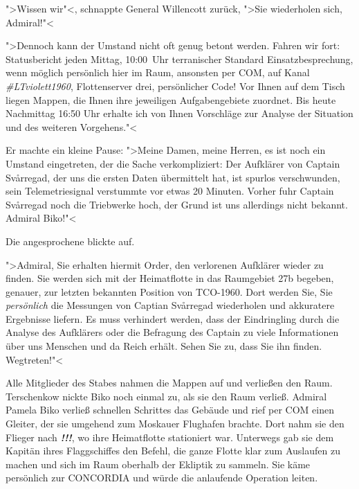 ">Wissen wir"<, schnappte General Willencott zurück, ">Sie wiederholen sich, Admiral!"<

\begin{sloppypar}
">Dennoch kann der Umstand nicht oft genug betont werden. Fahren wir fort: Statusbericht jeden Mittag, 10:00~Uhr terranischer Standard Einsatzbesprechung, wenn möglich persönlich hier im Raum, ansonsten per COM, auf Kanal \mbox{\emph{\#LTviolett1960}}, Flottenserver drei, persönlicher Code! Vor Ihnen auf dem Tisch liegen Mappen, die Ihnen ihre jeweiligen Aufgabengebiete zuordnet. Bis heute Nachmittag 16:50 Uhr erhalte ich von Ihnen Vorschläge zur Analyse der Situation und des weiteren Vorgehens."<
\end{sloppypar}

Er machte ein kleine Pause: ">Meine Damen, meine Herren, es ist noch ein Umstand eingetreten, der die Sache verkompliziert: Der Aufklärer von Captain Svårregad, der uns die ersten Daten übermittelt hat, ist spurlos verschwunden, sein Telemetriesignal verstummte vor etwas 20 Minuten. Vorher fuhr Captain Svårregad noch die Triebwerke hoch, der Grund ist uns allerdings nicht bekannt. Admiral Biko!"<

Die angesprochene blickte auf.

">Admiral, Sie erhalten hiermit Order, den verlorenen Aufklärer wieder zu finden. Sie werden sich mit der Heimatflotte in das Raumgebiet \textsf{27b} begeben, genauer, zur letzten bekannten Position von \textsf{TCO-1960}. Dort werden Sie, Sie \emph{persönlich} die Messungen von Captian Svårregad wiederholen und akkuratere Ergebnisse liefern. Es muss verhindert werden, dass der Eindringling durch die Analyse des Aufklärers oder die Befragung des Captain zu viele Informationen über uns Menschen und da Reich erhält. Sehen Sie zu, dass Sie ihn finden. Wegtreten!"<

Alle Mitglieder des Stabes nahmen die Mappen auf und verließen den Raum. Terschenkow nickte Biko noch einmal zu, als sie den Raum verließ. Admiral Pamela Biko verließ schnellen Schrittes das Gebäude und rief per COM einen Gleiter, der sie umgehend zum Moskauer Flughafen brachte. Dort nahm sie den Flieger nach \emph{\textbf{!!!}}, wo ihre Heimatflotte stationiert war. Unterwegs gab sie dem Kapitän ihres Flaggschiffes den Befehl, die ganze Flotte klar zum Auslaufen zu machen und sich im  Raum oberhalb der Ekliptik zu sammeln. Sie käme persönlich zur \textsf{CONCORDIA} und würde die anlaufende Operation leiten.

